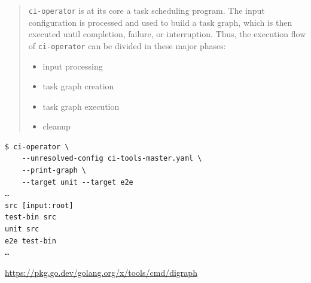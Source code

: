 \begin{frame}
    \autotitle
    \begin{quote}
        \texttt{ci-operator} is at its core a task scheduling program. The input
        configuration is processed and used to build a task graph, which is then
        executed until completion, failure, or interruption. Thus, the execution
        flow of \texttt{ci-operator} can be divided in these major phases:
        \begin{itemize}
            \item input processing
            \item task graph creation
            \item task graph execution
            \item cleanup
        \end{itemize}
    \end{quote}
\end{frame}

\begin{frame}[fragile]
    \autotitle
    \begin{verbatim}
$ ci-operator \
    --unresolved-config ci-tools-master.yaml \
    --print-graph \
    --target unit --target e2e
…
src [input:root]
test-bin src
unit src
e2e test-bin
…
    \end{verbatim} %
    \url{https://pkg.go.dev/golang.org/x/tools/cmd/digraph}
\end{frame}

